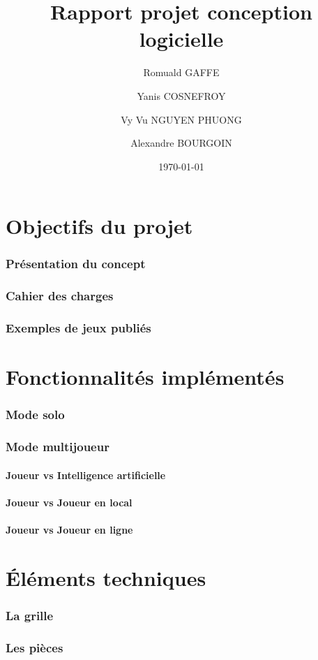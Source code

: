 \documentclass[]{report}
\title{Rapport projet conception logicielle}
\author{Romuald GAFFE\and Yanis COSNEFROY\and Vy Vu NGUYEN PHUONG\and Alexandre BOURGOIN}
\date{\today}
\begin{document}
\maketitle 
\tableofcontents
\part{Objectifs du projet}
\section{Présentation du concept}
\section{Cahier des charges}
\section{Exemples de jeux publiés}

\part{Fonctionnalités implémentés}
\section{Mode solo}
\section{Mode multijoueur}
\subsection{Joueur vs Intelligence artificielle}
\subsection{Joueur vs Joueur en local}
\subsection{Joueur vs Joueur en ligne}

\part{Éléments techniques}
\section{La grille}
\section{Les pièces}
\end{document}
